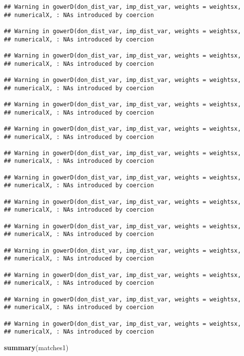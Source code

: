 \documentclass[]{article}
\newenvironment{Shaded}{\begin{snugshade}}{\end{snugshade}}
\newcommand{\KeywordTok}[1]{\textcolor[rgb]{0.13,0.29,0.53}{\textbf{#1}}}
\newcommand{\NormalTok}[1]{#1}
\begin{document}
\begin{verbatim}
## Warning in gowerD(don_dist_var, imp_dist_var, weights = weightsx,
## numericalX, : NAs introduced by coercion

## Warning in gowerD(don_dist_var, imp_dist_var, weights = weightsx,
## numericalX, : NAs introduced by coercion

## Warning in gowerD(don_dist_var, imp_dist_var, weights = weightsx,
## numericalX, : NAs introduced by coercion

## Warning in gowerD(don_dist_var, imp_dist_var, weights = weightsx,
## numericalX, : NAs introduced by coercion

## Warning in gowerD(don_dist_var, imp_dist_var, weights = weightsx,
## numericalX, : NAs introduced by coercion

## Warning in gowerD(don_dist_var, imp_dist_var, weights = weightsx,
## numericalX, : NAs introduced by coercion

## Warning in gowerD(don_dist_var, imp_dist_var, weights = weightsx,
## numericalX, : NAs introduced by coercion

## Warning in gowerD(don_dist_var, imp_dist_var, weights = weightsx,
## numericalX, : NAs introduced by coercion

## Warning in gowerD(don_dist_var, imp_dist_var, weights = weightsx,
## numericalX, : NAs introduced by coercion

## Warning in gowerD(don_dist_var, imp_dist_var, weights = weightsx,
## numericalX, : NAs introduced by coercion

## Warning in gowerD(don_dist_var, imp_dist_var, weights = weightsx,
## numericalX, : NAs introduced by coercion

## Warning in gowerD(don_dist_var, imp_dist_var, weights = weightsx,
## numericalX, : NAs introduced by coercion

## Warning in gowerD(don_dist_var, imp_dist_var, weights = weightsx,
## numericalX, : NAs introduced by coercion

## Warning in gowerD(don_dist_var, imp_dist_var, weights = weightsx,
## numericalX, : NAs introduced by coercion
\end{verbatim}

\begin{Shaded}
\begin{Highlighting}[]
\KeywordTok{summary}\NormalTok{(matches1)}
\end{Highlighting}
\end{Shaded}
\end{document}
